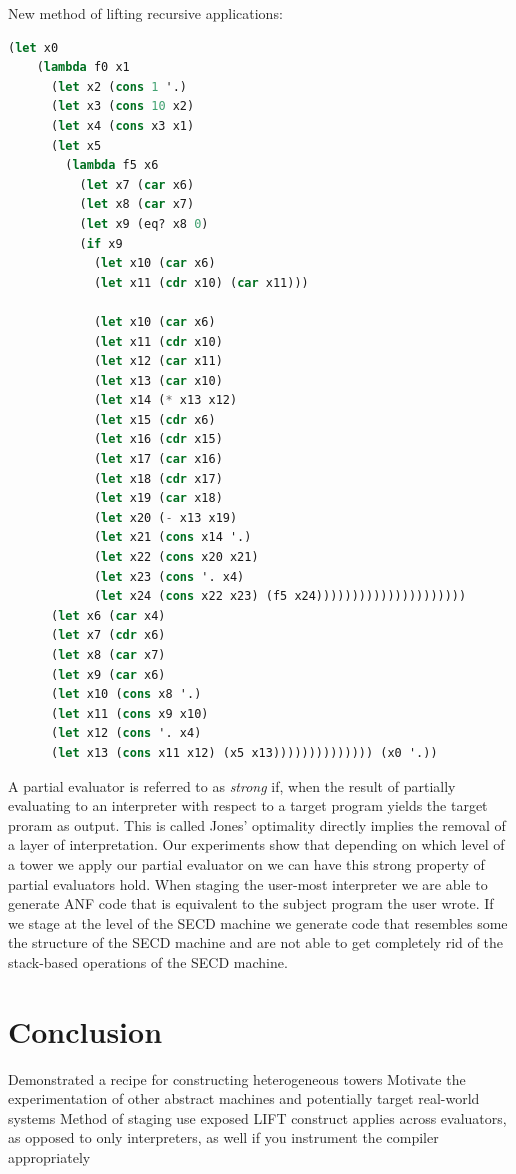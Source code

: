 \documentclass[fleqn]{article}
\theoremstyle{definition}
\begin{document}
New method of lifting recursive applications:
\begin{lstlisting}[language=Lisp]
	(let x0
	(lambda f0 x1
	  (let x2 (cons 1 '.)
	  (let x3 (cons 10 x2)
	  (let x4 (cons x3 x1)
	  (let x5
		(lambda f5 x6
		  (let x7 (car x6)
		  (let x8 (car x7)
		  (let x9 (eq? x8 0)
		  (if x9
			(let x10 (car x6)
			(let x11 (cdr x10) (car x11)))
  
			(let x10 (car x6)
			(let x11 (cdr x10)
			(let x12 (car x11)
			(let x13 (car x10)
			(let x14 (* x13 x12)
			(let x15 (cdr x6)
			(let x16 (cdr x15)
			(let x17 (car x16)
			(let x18 (cdr x17)
			(let x19 (car x18)
			(let x20 (- x13 x19)
			(let x21 (cons x14 '.)
			(let x22 (cons x20 x21)
			(let x23 (cons '. x4)
			(let x24 (cons x22 x23) (f5 x24)))))))))))))))))))))
	  (let x6 (car x4)
	  (let x7 (cdr x6)
	  (let x8 (car x7)
	  (let x9 (car x6)
	  (let x10 (cons x8 '.)
	  (let x11 (cons x9 x10)
	  (let x12 (cons '. x4)
	  (let x13 (cons x11 x12) (x5 x13)))))))))))))) (x0 '.))
\end{lstlisting}

A partial evaluator is referred to as \textit{strong} if, when the result of partially evaluating to an interpreter with respect to a target program yields the target proram as output. This is called Jones' optimality directly implies the removal of a layer of interpretation. Our experiments show that depending on which level of a tower we apply our partial evaluator on we can have this strong property of partial evaluators hold. When staging the user-most interpreter we are able to generate ANF code that is equivalent to the subject program the user wrote. If we stage at the level of the SECD machine we generate code that resembles some the structure of the SECD machine and are not able to get completely rid of the stack-based operations of the SECD machine.

\section{Conclusion}

Demonstrated a recipe for constructing heterogeneous towers
Motivate the experimentation of other abstract machines and potentially target real-world systems
Method of staging use exposed LIFT construct applies across evaluators, as opposed to only interpreters, as well if you instrument the compiler appropriately
\end{document}
